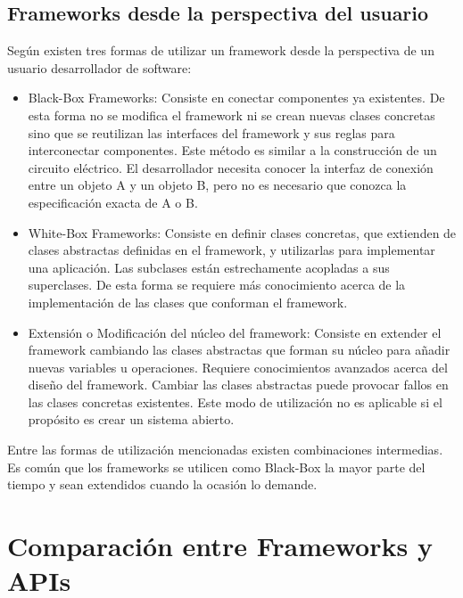 \subsection{Frameworks desde la perspectiva del usuario}
\label{sec:tipos_framework}
    Según \cite{JohnsonFeb97} existen tres formas de utilizar un framework
    desde la perspectiva de un usuario desarrollador de software: 
\begin{itemize}
    \item Black-Box Frameworks: Consiste en conectar componentes ya existentes.
    De esta forma no se modifica el framework ni se crean nuevas clases
    concretas sino que se reutilizan las interfaces del framework y sus reglas
    para interconectar componentes. Este método es similar a la construcción de
    un circuito eléctrico. El desarrollador necesita conocer la interfaz de
    conexión entre un objeto A y un objeto B, pero no es necesario que conozca
    la especificación exacta de A o B.

    \item White-Box Frameworks: Consiste en definir clases concretas, que
    extienden de clases abstractas definidas en el framework, y utilizarlas
    para implementar una aplicación. Las subclases están estrechamente
    acopladas a sus superclases. De esta forma se requiere más conocimiento
    acerca de la implementación de las clases que conforman el framework.
	
	\item Extensión o Modificación del núcleo del framework:  Consiste en extender
	el framework cambiando las clases abstractas que forman su núcleo para añadir
	nuevas variables u operaciones. Requiere conocimientos avanzados acerca del
	diseño del framework. Cambiar las clases abstractas puede provocar fallos en
	las clases concretas existentes. Este modo de utilización no es aplicable si
	el propósito es crear un sistema abierto.
\end{itemize}

Entre las formas de utilización mencionadas existen combinaciones intermedias. Es común
que los frameworks se utilicen como Black-Box la mayor parte del tiempo y
sean extendidos cuando la ocasión lo demande.

\newpage
\section{Comparación entre Frameworks y APIs}

